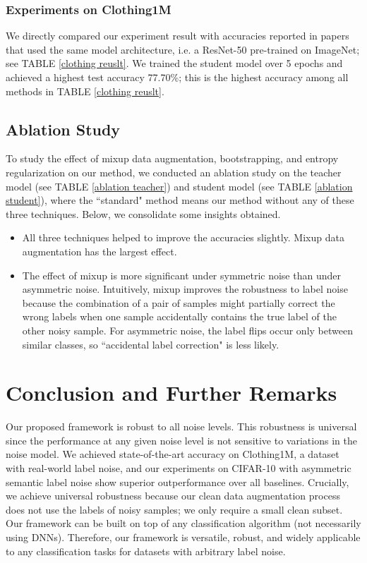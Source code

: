 \documentclass[conference]{IEEEtran}
\begin{document}
\subsubsection{Experiments on Clothing1M}


We directly compared our experiment result with accuracies reported in papers that used the same model architecture, i.e. a ResNet-50 \cite{he2016identity} pre-trained on ImageNet; see TABLE \ref{clothing reuslt}. 
We trained the student model over 5 epochs and achieved a highest test accuracy 77.70\%; this is the highest accuracy among all methods in TABLE \ref{clothing reuslt}.


\subsection{Ablation Study}
\label{ablation study}
To study the effect of mixup data augmentation, bootstrapping, and entropy regularization on our method, we conducted an ablation study on the teacher model (see TABLE \ref{ablation teacher}) and student model (see TABLE \ref{ablation student}), where the ``standard" method means our method without any of these three techniques. Below, we consolidate some insights obtained.

\begin{itemize}
\item All three techniques helped to improve the accuracies slightly. Mixup data augmentation has the largest effect.
\item The effect of mixup is more significant under symmetric noise than under asymmetric noise. Intuitively, mixup improves the robustness to label noise because the combination of a pair of samples might partially correct the wrong labels when one sample accidentally contains the true label of the other noisy sample. For asymmetric noise, the label flips occur only between similar classes, so ``accidental label correction" is less likely.
\end{itemize}
  







\section{Conclusion and Further Remarks}
Our proposed framework is robust to all noise levels. This robustness is universal since the performance at any given noise level is not sensitive to variations in the noise model. 
We achieved state-of-the-art accuracy on Clothing1M, a dataset with real-world label noise, and our experiments on CIFAR-10 with asymmetric semantic label noise show superior outperformance over all baselines. 
Crucially, we achieve universal robustness because our clean data augmentation process does not use the labels of noisy samples; we only require a small clean subset. 
Our framework can be built on top of any classification algorithm (not necessarily using DNNs). Therefore, our framework is versatile, robust, and widely applicable to any classification tasks for datasets with arbitrary label noise.
\end{document}
